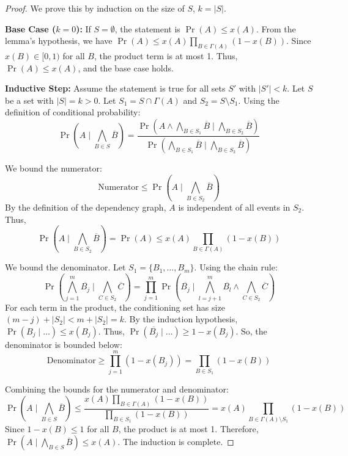 \begin{proof}
    We prove this by induction on the size of $S$, $k = |S|$.

    \textbf{Base Case ($k=0$):} If $S = \emptyset$, the statement is $\Pr(A) \leq x(A)$. From the lemma's hypothesis, we have $\Pr(A) \leq x(A) \prod_{B \in \Gamma(A)} (1-x(B))$. Since $x(B) \in [0,1)$ for all $B$, the product term is at most 1. Thus, $\Pr(A) \leq x(A)$, and the base case holds.

    \textbf{Inductive Step:} Assume the statement is true for all sets $S'$ with $|S'| < k$. Let $S$ be a set with $|S| = k > 0$. Let $S_1 = S \cap \Gamma(A)$ and $S_2 = S \setminus S_1$.
    Using the definition of conditional probability:
    $$ \Pr\left(A \mid \bigwedge_{B \in S} \overline{B}\right) = \frac{\Pr\left(A \wedge \bigwedge_{B \in S_1} \overline{B} \mid \bigwedge_{B \in S_2} \overline{B}\right)}{\Pr\left(\bigwedge_{B \in S_1} \overline{B} \mid \bigwedge_{B \in S_2} \overline{B}\right)} $$

    We bound the numerator:
    $$ \text{Numerator} \leq \Pr\left(A \mid \bigwedge_{B \in S_2} \overline{B}\right) $$
    By the definition of the dependency graph, $A$ is independent of all events in $S_2$. Thus,
    $$ \Pr\left(A \mid \bigwedge_{B \in S_2} \overline{B}\right) = \Pr(A) \leq x(A) \prod_{B \in \Gamma(A)} (1-x(B)) $$

    We bound the denominator. Let $S_1 = \{B_1, \dots, B_m\}$. Using the chain rule:
    $$ \Pr\left(\bigwedge_{j=1}^m \overline{B_j} \mid \bigwedge_{C \in S_2} \overline{C}\right) = \prod_{j=1}^m \Pr\left(\overline{B_j} \mid \bigwedge_{l=j+1}^m \overline{B_l} \wedge \bigwedge_{C \in S_2} \overline{C}\right) $$
    For each term in the product, the conditioning set has size $(m-j) + |S_2| < m + |S_2| = k$. By the induction hypothesis, $\Pr\left(B_j \mid \dots\right) \leq x(B_j)$. Thus, $\Pr\left(\overline{B_j} \mid \dots\right) \geq 1-x(B_j)$.
    So, the denominator is bounded below:
    $$ \text{Denominator} \geq \prod_{j=1}^m (1 - x(B_j)) = \prod_{B \in S_1} (1-x(B)) $$

    Combining the bounds for the numerator and denominator:
    $$ \Pr\left(A \mid \bigwedge_{B \in S} \overline{B}\right) \leq \frac{x(A) \prod_{B \in \Gamma(A)} (1-x(B))}{\prod_{B \in S_1} (1-x(B))} = x(A) \prod_{B \in \Gamma(A) \setminus S_1} (1-x(B)) $$
    Since $1-x(B) \leq 1$ for all $B$, the product is at most 1. Therefore, $\Pr\left(A \mid \bigwedge_{B \in S} \overline{B}\right) \leq x(A)$. The induction is complete.
\end{proof}

